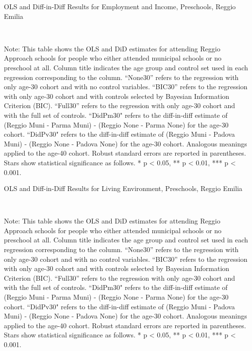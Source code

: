 \begin{landscape}
\begin{table}[H] \caption{OLS and Diff-in-Diff Results for Employment and Income, Preschools, Reggio Emilia} \label{ols-W-reg}
\scalebox{0.85}{
}
\vspace{1ex} \\
\footnotesize\raggedright{Note: This table shows the OLS and DiD estimates for attending Reggio Approach schools for people who either attended municipal schools or no preschool at all. Column title indicates the age group and control set used in each regression corresponding to the column. ``None30'' refers to the regression with only age-30 cohort and with no control variables. ``BIC30'' refers to the regression with only age-30 cohort and with controls selected by Bayesian Information Criterion (BIC). ``Full30'' refers to the regression with only age-30 cohort and with the full set of controls. ``DidPm30" refers to the diff-in-diff estimate of (Reggio Muni - Parma Muni) - (Reggio None - Parma None) for the age-30 cohort. ``DidPv30" refers to the diff-in-diff estimate of (Reggio Muni - Padova Muni) - (Reggio None - Padova None) for the age-30 cohort. Analogous meanings applied to the age-40 cohort. Robust standard errors are reported in parentheses. Stars show statistical significance as follows. * p < 0.05, ** p < 0.01, *** p < 0.001.}
\end{table}


\begin{table}[H] \caption{OLS and Diff-in-Diff Results for Living Environment, Preschools, Reggio Emilia} \label{ols-L-reg}
\scalebox{0.85}{
}
\vspace{1ex} \\
\footnotesize\raggedright{Note: This table shows the OLS and DiD estimates for attending Reggio Approach schools for people who either attended municipal schools or no preschool at all. Column title indicates the age group and control set used in each regression corresponding to the column. ``None30'' refers to the regression with only age-30 cohort and with no control variables. ``BIC30'' refers to the regression with only age-30 cohort and with controls selected by Bayesian Information Criterion (BIC). ``Full30'' refers to the regression with only age-30 cohort and with the full set of controls. ``DidPm30" refers to the diff-in-diff estimate of (Reggio Muni - Parma Muni) - (Reggio None - Parma None) for the age-30 cohort. ``DidPv30" refers to the diff-in-diff estimate of (Reggio Muni - Padova Muni) - (Reggio None - Padova None) for the age-30 cohort. Analogous meanings applied to the age-40 cohort. Robust standard errors are reported in parentheses. Stars show statistical significance as follows. * p < 0.05, ** p < 0.01, *** p < 0.001.}
\end{table}


\end{landscape}
